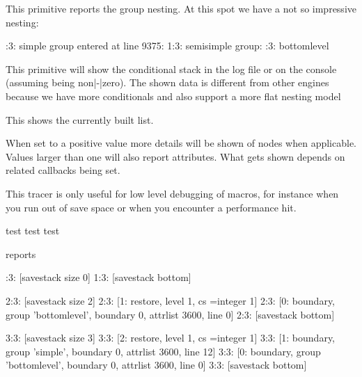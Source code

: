 \stopnewprimitive

\startoldprimitive[title={\prm {showgroups}}]

This primitive reports the group nesting. At this spot we have a not so
impressive nesting:

:3: simple group entered at line 9375:
1:3: semisimple group: :3: bottomlevel
\stoptyping

\stopoldprimitive

\startoldprimitive[title={\prm {showifs}}]

This primitive will show the conditional stack in the log file or on the console
(assuming  being non|-|zero). The shown data is different
from other engines because we have more conditionals and also support a more flat
nesting model

\stopoldprimitive

\startoldprimitive[title={\prm {showlists}}]

This shows the currently built list.

\stopoldprimitive

\startoldprimitive[title={\prm {shownodedetails}}]

When set to a positive value more details will be shown of nodes when applicable.
Values larger than one will also report attributes. What gets shown depends on
related callbacks being set.

\stopoldprimitive

\startoldprimitive[title={\prm {showstack}}]

This tracer is only useful for low level debugging of macros, for instance when
you run out of save space or when you encounter a performance hit.

\starttyping
  test \showstack
 {test \showstack}
{{test \showstack}}
\stoptyping

reports

:3: [savestack size 0]
1:3: [savestack bottom]

2:3: [savestack size 2]
2:3: [1: restore, level 1, cs \scratchcounter=integer 1]
2:3: [0: boundary, group 'bottomlevel', boundary 0, attrlist 3600, line 0]
2:3: [savestack bottom]

3:3: [savestack size 3]
3:3: [2: restore, level 1, cs \scratchcounter=integer 1]
3:3: [1: boundary, group 'simple', boundary 0, attrlist 3600, line 12]
3:3: [0: boundary, group 'bottomlevel', boundary 0, attrlist 3600, line 0]
3:3: [savestack bottom]
\stoptyping

